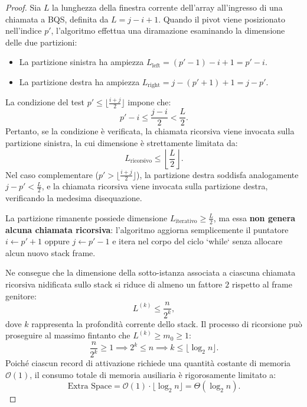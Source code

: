 \begin{proof}
Sia $L$ la lunghezza della finestra corrente dell'array all'ingresso di una chiamata a BQS, definita da $L = j - i + 1$. Quando il pivot viene posizionato nell'indice $p'$, l'algoritmo effettua una diramazione esaminando la dimensione delle due partizioni:
\begin{itemize}
  \item La partizione sinistra ha ampiezza $L_{\text{left}} = (p' - 1) - i + 1 = p' - i$.
  \item La partizione destra ha ampiezza $L_{\text{right}} = j - (p' + 1) + 1 = j - p'$.
\end{itemize}
La condizione del test $p' \le \lfloor \frac{i + j}{2} \rfloor$ impone che:
\begin{equation}
  p' - i \le \frac{j - i}{2} < \frac{L}{2}.
\end{equation}
Pertanto, se la condizione è verificata, la chiamata ricorsiva viene invocata sulla partizione sinistra, la cui dimensione è strettamente limitata da:
\begin{equation}
  L_{\text{ricorsivo}} \le \left\lfloor \frac{L}{2} \right\rfloor.
\end{equation}
Nel caso complementare ($p' > \lfloor \frac{i + j}{2} \rfloor$), la partizione destra soddisfa analogamente $j - p' < \frac{L}{2}$, e la chiamata ricorsiva viene invocata sulla partizione destra, verificando la medesima disequazione.

La partizione rimanente possiede dimensione $L_{\text{iterativo}} \ge \frac{L}{2}$, ma essa \textbf{non genera alcuna chiamata ricorsiva}: l'algoritmo aggiorna semplicemente il puntatore $i \leftarrow p' + 1$ oppure $j \leftarrow p' - 1$ e itera nel corpo del ciclo `while` senza allocare alcun nuovo stack frame.

Ne consegue che la dimensione della sotto-istanza associata a ciascuna chiamata ricorsiva nidificata sullo stack si riduce di almeno un fattore $2$ rispetto al frame genitore:
\begin{equation}
  L^{(k)} \le \frac{n}{2^k},
\end{equation}
dove $k$ rappresenta la profondità corrente dello stack. Il processo di ricorsione può proseguire al massimo fintanto che $L^{(k)} \ge m_0 \ge 1$:
\begin{equation}
  \frac{n}{2^k} \ge 1 \implies 2^k \le n \implies k \le \lfloor \log_2 n \rfloor.
\end{equation}
Poiché ciascun record di attivazione richiede una quantità costante di memoria $\mathcal{O}(1)$, il consumo totale di memoria ausiliaria è rigorosamente limitato a:
\begin{equation}
  \text{Extra Space} = \mathcal{O}(1) \cdot \lfloor \log_2 n \rfloor = \Theta(\log_2 n).
\end{equation}
\end{proof}

